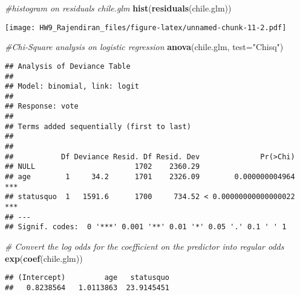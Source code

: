 \documentclass[]{article}
\newenvironment{Shaded}{\begin{snugshade}}{\end{snugshade}}
\newcommand{\CommentTok}[1]{\textcolor[rgb]{0.56,0.35,0.01}{\textit{#1}}}
\newcommand{\DataTypeTok}[1]{\textcolor[rgb]{0.13,0.29,0.53}{#1}}
\newcommand{\KeywordTok}[1]{\textcolor[rgb]{0.13,0.29,0.53}{\textbf{#1}}}
\newcommand{\NormalTok}[1]{#1}
\newcommand{\OperatorTok}[1]{\textcolor[rgb]{0.81,0.36,0.00}{\textbf{#1}}}
\newcommand{\StringTok}[1]{\textcolor[rgb]{0.31,0.60,0.02}{#1}}
\begin{document}
\begin{Shaded}
\begin{Highlighting}[]
\CommentTok{#histogram on residuals chile.glm}
\KeywordTok{hist}\NormalTok{(}\KeywordTok{residuals}\NormalTok{(chile.glm))}
\end{Highlighting}
\end{Shaded}

\texttt{[image: HW9\_Rajendiran\_files/figure-latex/unnamed-chunk-11-2.pdf]}

\begin{Shaded}
\begin{Highlighting}[]
\CommentTok{#Chi-Square analysis on logistic regression}
\KeywordTok{anova}\NormalTok{(chile.glm, }\DataTypeTok{test=}\StringTok{"Chisq"}\NormalTok{)}
\end{Highlighting}
\end{Shaded}

\begin{verbatim}
## Analysis of Deviance Table
## 
## Model: binomial, link: logit
## 
## Response: vote
## 
## Terms added sequentially (first to last)
## 
## 
##           Df Deviance Resid. Df Resid. Dev              Pr(>Chi)    
## NULL                       1702    2360.29                          
## age        1     34.2      1701    2326.09        0.000000004964 ***
## statusquo  1   1591.6      1700     734.52 < 0.00000000000000022 ***
## ---
## Signif. codes:  0 '***' 0.001 '**' 0.01 '*' 0.05 '.' 0.1 ' ' 1
\end{verbatim}

\begin{Shaded}
\begin{Highlighting}[]
\CommentTok{# Convert the log odds for the coefficient on the predictor into regular odds}
\KeywordTok{exp}\NormalTok{(}\KeywordTok{coef}\NormalTok{(chile.glm))}
\end{Highlighting}
\end{Shaded}

\begin{verbatim}
## (Intercept)         age   statusquo 
##   0.8238564   1.0113863  23.9145451
\end{verbatim}

\begin{Shaded}
\end{Shaded}
\end{document}
